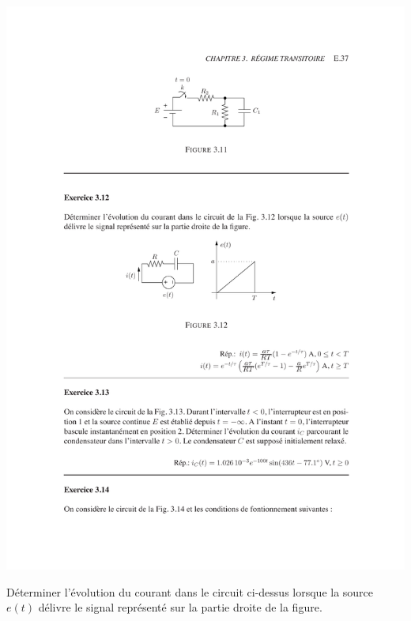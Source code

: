 \begin{exercise}{}
	\label{ex:2-12}
\begin{center}
	\includegraphics[width=0.7\linewidth]{exercices/ex-3-12}
\end{center}
D\'eterminer l'\'evolution du courant dans le circuit ci-dessus
lorsque la source $e(t)$ d\'elivre le signal repr\'esent\'e sur la partie
droite de la figure. 

\end{exercise}


